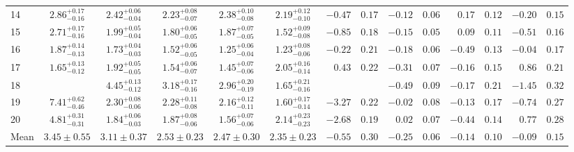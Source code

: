 \begin{tabular}{@{}l ccccc r@{ $\pm$ }l r@{ $\pm$ }l r@{ $\pm$ }l r@{ $\pm$ }l @{}}
\cmidrule{1-14}
14 & ${2.86}^{+0.17}_{-0.16}$ & ${2.42}^{+0.06}_{-0.04}$ & ${2.23}^{+0.08}_{-0.07}$ & ${2.38}^{+0.10}_{-0.08}$ & ${2.19}^{+0.12}_{-0.10}$
  & $-0.47$ & $0.17$ & $-0.12$ & $0.06$ & $0.17$ & $0.12$ & $-0.20$ & $0.15$ \\ [0.5em]
15 & ${2.71}^{+0.17}_{-0.16}$ & ${1.99}^{+0.05}_{-0.04}$ & ${1.80}^{+0.06}_{-0.05}$ & ${1.87}^{+0.07}_{-0.05}$ & ${1.52}^{+0.09}_{-0.08}$
  & $-0.85$ & $0.18$ & $-0.15$ & $0.05$ & $0.09$ & $0.11$ & $-0.51$ & $0.16$ \\ [0.5em]
16 & ${1.87}^{+0.14}_{-0.13}$ & ${1.73}^{+0.04}_{-0.03}$ & ${1.52}^{+0.06}_{-0.05}$ & ${1.25}^{+0.06}_{-0.04}$ & ${1.23}^{+0.08}_{-0.06}$
  & $-0.22$ & $0.21$ & $-0.18$ & $0.06$ & $-0.49$ & $0.13$ & $-0.04$ & $0.17$ \\ [0.5em]
17 & ${1.65}^{+0.13}_{-0.12}$ & ${1.92}^{+0.05}_{-0.05}$ & ${1.54}^{+0.06}_{-0.07}$ & ${1.45}^{+0.07}_{-0.06}$ & ${2.05}^{+0.16}_{-0.14}$
  & $0.43$ & $0.22$ & $-0.31$ & $0.07$ & $-0.16$ & $0.15$ & $0.86$ & $0.21$ \\

\cmidrule{1-14}
18 & {} & ${4.45}^{+0.13}_{-0.12}$ & ${3.18}^{+0.17}_{-0.16}$ & ${2.96}^{+0.20}_{-0.19}$ & ${1.65}^{+0.21}_{-0.16}$
  & \multicolumn{2}{c}{} & $-0.49$ & $0.09$ & $-0.17$ & $0.21$ & $-1.45$ & $0.32$ \\ [0.5em]
19 & ${7.41}^{+0.62}_{-0.46}$ & ${2.30}^{+0.08}_{-0.06}$ & ${2.28}^{+0.11}_{-0.08}$ & ${2.16}^{+0.12}_{-0.11}$ & ${1.60}^{+0.17}_{-0.14}$
  & $-3.27$ & $0.22$ & $-0.02$ & $0.08$ & $-0.13$ & $0.17$ & $-0.74$ & $0.27$ \\ [0.5em]
20 & ${4.81}^{+0.31}_{-0.31}$ & ${1.84}^{+0.06}_{-0.03}$ & ${1.87}^{+0.08}_{-0.06}$ & ${1.56}^{+0.07}_{-0.06}$ & ${2.14}^{+0.23}_{-0.23}$
  & $-2.68$ & $0.19$ & $0.02$ & $0.07$ & $-0.44$ & $0.14$ & $0.77$ & $0.28$ \\
\midrule
Mean & $3.45 \pm 0.55$ & $3.11 \pm 0.37$ & $2.53 \pm 0.23$ & $2.47 \pm 0.30$ & $2.35 \pm 0.23$
  & $-0.55$ & $0.30$ & $-0.25$ & $0.06$ & $-0.14$ & $0.10$ & $-0.09$ & $0.15$ \\

\bottomrule
\end{tabular}
